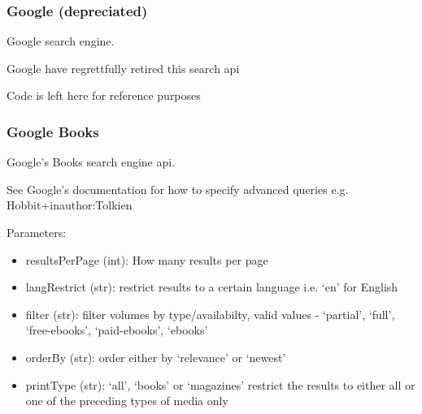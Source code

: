 \documentclass[letterpaper,10pt,english]{sphinxmanual}
\begin{document}
\subsubsection{Google (depreciated)}
\label{api3.0:google-depreciated}

\begin{fulllineitems}
\label{api3.0:puppy.search.engine.Google}
Google search engine.

Google have regrettfully retired this search api

Code is left here for reference purposes

\end{fulllineitems}



\subsubsection{Google Books}
\label{api3.0:google-books}

\begin{fulllineitems}
\label{api3.0:puppy.search.engine.GoogleBooks}
Google's Books search engine api.

See Google's documentation for how to specify advanced queries e.g. Hobbit+inauthor:Tolkien

Parameters:
\begin{itemize}
\item {} 
resultsPerPage (int): How many results per page

\item {} 
langRestrict (str): restrict results to a certain language i.e. `en' for English

\item {} 
filter (str): filter volumes by type/availabilty, valid values - `partial', `full', `free-ebooks', `paid-ebooks', `ebooks'

\item {} 
orderBy (str): order either by `relevance' or `newest'

\item {} 
printType (str): `all', `books' or `magazines' restrict the results to either all or one of the preceding types of media only

\end{itemize}

\end{fulllineitems}
\end{document}
